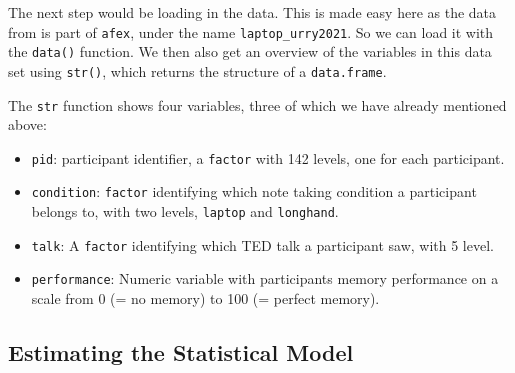 \documentclass[
]{book}
\newenvironment{Shaded}{\begin{snugshade}}{\end{snugshade}}
\newcommand{\CommentTok}[1]{\textcolor[rgb]{0.56,0.35,0.01}{\textit{#1}}}
\newcommand{\FunctionTok}[1]{\textcolor[rgb]{0.00,0.00,0.00}{#1}}
\newcommand{\NormalTok}[1]{#1}
\newcommand{\StringTok}[1]{\textcolor[rgb]{0.31,0.60,0.02}{#1}}
\begin{document}
The next step would be loading in the data. This is made easy here as the data from \citet{urry2021} is part of \texttt{afex}, under the name \texttt{laptop\_urry2021}. So we can load it with the \texttt{data()} function. We then also get an overview of the variables in this data set using \texttt{str()}, which returns the structure of a \texttt{data.frame}.

\begin{Shaded}
\end{Shaded}

The \texttt{str} function shows four variables, three of which we have already mentioned above:

\begin{itemize}
\item
  \texttt{pid}: participant identifier, a \texttt{factor} with 142 levels, one for each participant.
\item
  \texttt{condition}: \texttt{factor} identifying which note taking condition a participant belongs to, with two levels, \texttt{laptop} and \texttt{longhand}.
\item
  \texttt{talk}: A \texttt{factor} identifying which TED talk a participant saw, with 5 level.
\item
  \texttt{performance}: Numeric variable with participants memory performance on a scale from 0 (= no memory) to 100 (= perfect memory).
\end{itemize}

\hypertarget{estimating-the-statistical-model}{%
\subsection{Estimating the Statistical Model}\label{estimating-the-statistical-model}}
\end{document}
